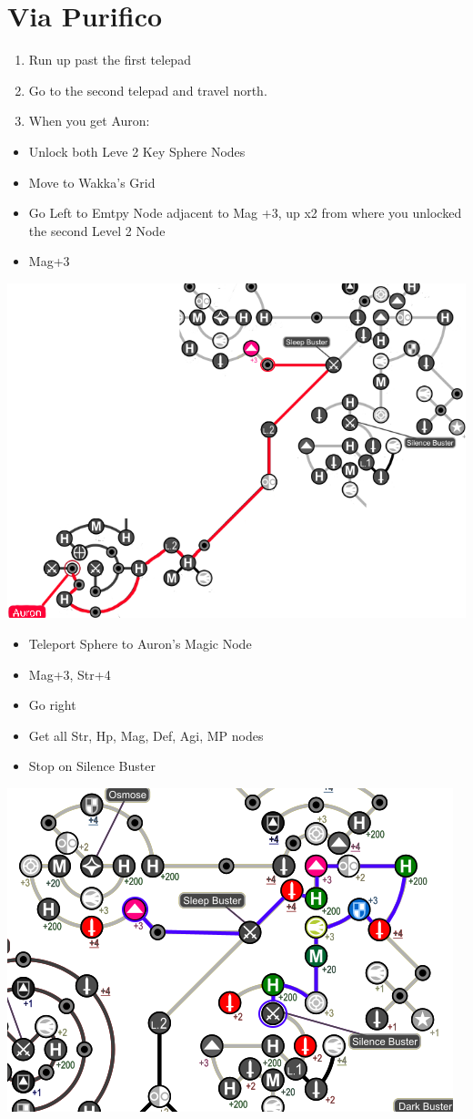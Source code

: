 \chapter{Via Purifico}

\begin{enumerate}
  \item Run up past the first telepad
  \item Go to the second telepad and travel north.
  \item When you get Auron:
\end{enumerate}
\begin{spheregrid}
  \begin{itemize}
    \auronf
    \begin{itemize}
      \item Unlock both Leve 2 Key Sphere Nodes
      \item Move to Wakka's Grid
      \item Go Left to Emtpy Node adjacent to Mag +3, up x2 from where you unlocked the second Level 2 Node
      \item Mag+3
    \end{itemize}
    \includegraphics[width=.8\columnwidth]{graphics/Auron_Via_Purifico}
    \yunaf
    \begin{itemize}
      \item Teleport Sphere to Auron's Magic Node
      \item Mag+3, Str+4
      \item Go right
      \item Get all Str, Hp, Mag, Def, Agi, MP nodes
      \item Stop on Silence Buster
    \end{itemize}
    \includegraphics[width=.8\columnwidth]{graphics/Yuna_Via_Purifico}

\end{itemize}
\end{spheregrid}
